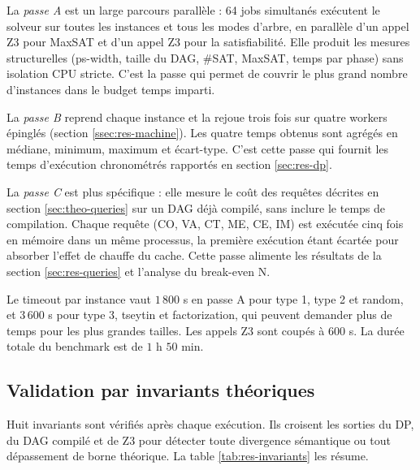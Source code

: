 \documentclass[11pt,a4paper]{report}
\theoremstyle{plain}
\theoremstyle{definition}
\begin{document}
La \emph{passe A} est un large parcours parallèle : 64 jobs
simultanés exécutent le solveur sur toutes les instances et tous
les modes d'arbre, en parallèle d'un appel Z3 pour MaxSAT et d'un
appel Z3 pour la satisfiabilité. Elle produit les mesures
structurelles (ps-width, taille du DAG, \#SAT, MaxSAT, temps par
phase) sans isolation CPU stricte. C'est la passe qui permet de
couvrir le plus grand nombre d'instances dans le budget temps imparti.

La \emph{passe B} reprend chaque instance et la rejoue trois fois
sur quatre workers épinglés (section \ref{ssec:res-machine}). Les
quatre temps obtenus sont agrégés en médiane, minimum, maximum et
écart-type. C'est cette passe qui fournit les temps d'exécution
chronométrés rapportés en section \ref{sec:res-dp}.

La \emph{passe C} est plus spécifique : elle mesure le coût des
requêtes décrites en section \ref{sec:theo-queries} sur un DAG
déjà compilé, sans inclure le temps de compilation. Chaque requête
(CO, VA, CT, ME, CE, IM) est
exécutée cinq fois en mémoire dans un même processus, la première
exécution étant écartée pour absorber l'effet de chauffe du cache.
Cette passe alimente les résultats de la section \ref{sec:res-queries}
et l'analyse du break-even N.

Le timeout par instance vaut $1\,800$ s en passe A pour type 1, type 2
et random, et $3\,600$ s pour type 3, tseytin et factorization, qui
peuvent demander plus de temps pour les plus grandes tailles. Les
appels Z3 sont coupés à $600$ s. La durée totale du benchmark est
de $1$ h $50$ min.

\subsection{Validation par invariants théoriques}
\label{ssec:res-invariants}

Huit invariants sont vérifiés après chaque exécution. Ils croisent
les sorties du DP, du DAG compilé et de Z3 pour détecter toute
divergence sémantique ou tout dépassement de borne théorique. La
table \ref{tab:res-invariants} les résume.
\end{document}
